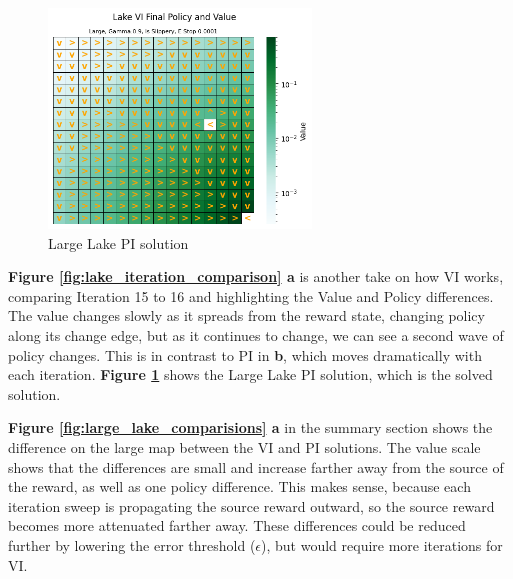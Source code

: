 \documentclass[letterpaper]{article} %
\begin{document}
\begin{figure}[!htb]
\centering
\includegraphics[width=2.75in]{Figures/Lake_VI_Final_Policy_and_Value_Large__Gamma_0_9__Is_Slippery__E_Stop_0_0001.png}
\caption{Large Lake PI solution}
\label{fig:lake_pi_large_solution}
\end{figure}

\textbf{Figure \ref{fig:lake_iteration_comparison} a} is another take on how VI works, comparing Iteration 15 to 16 and highlighting the Value and Policy differences.  The value changes slowly as it spreads from the reward state, changing policy along its change edge, but as it continues to change, we can see a second wave of policy changes.  This is in contrast to PI in \textbf{b}, which moves dramatically with each iteration.  \textbf{Figure \ref{fig:lake_pi_large_solution}} shows the Large Lake PI solution, which is the solved solution.

\textbf{Figure \ref{fig:large_lake_comparisions} a} in the summary section shows the difference on the large map between the VI and PI solutions.  The value scale shows that the differences are small and increase farther away from the source of the reward, as well as one policy difference.  This makes sense, because each iteration sweep is propagating the source reward outward, so the source reward becomes more attenuated farther away. These differences could be reduced further by lowering the error threshold ($\epsilon$), but would require more iterations for VI.
\end{document}
